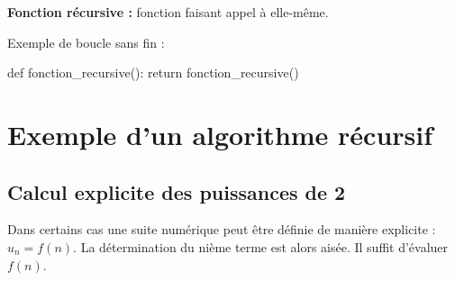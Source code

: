 \documentclass[10pt,fleqn]{article} %
\begin{document}
\begin{defi}
\textbf{Fonction récursive : } fonction faisant appel à elle-même.
\end{defi}

\begin{py}Exemple de boucle sans fin :
\begin{python}
def fonction_recursive():
    return fonction_recursive()
\end{python}
\end{py}

\section{Exemple d'un algorithme récursif}
\subsection{Calcul explicite des puissances de 2}

Dans certains cas une suite numérique peut être définie de manière explicite : $u_n = f(n)$. 
La détermination du nième terme est alors aisée. Il suffit d’évaluer $f(n)$.
\end{document}
